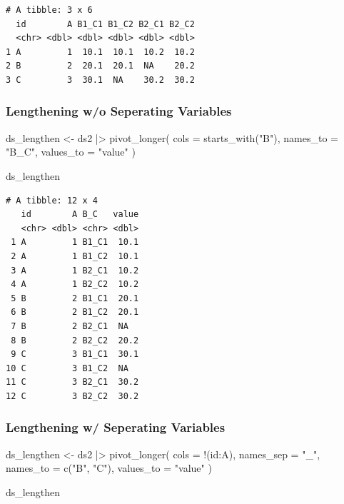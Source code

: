 \documentclass[
  letterpaper,
  DIV=11,
  numbers=noendperiod]{scrreprt}
\newenvironment{Shaded}{\begin{snugshade}}{\end{snugshade}}
\newcommand{\AttributeTok}[1]{\textcolor[rgb]{0.40,0.45,0.13}{#1}}
\newcommand{\FunctionTok}[1]{\textcolor[rgb]{0.28,0.35,0.67}{#1}}
\newcommand{\NormalTok}[1]{\textcolor[rgb]{0.00,0.23,0.31}{#1}}
\newcommand{\OtherTok}[1]{\textcolor[rgb]{0.00,0.23,0.31}{#1}}
\newcommand{\SpecialCharTok}[1]{\textcolor[rgb]{0.37,0.37,0.37}{#1}}
\newcommand{\StringTok}[1]{\textcolor[rgb]{0.13,0.47,0.30}{#1}}
\begin{document}
\begin{verbatim}
# A tibble: 3 x 6
  id        A B1_C1 B1_C2 B2_C1 B2_C2
  <chr> <dbl> <dbl> <dbl> <dbl> <dbl>
1 A         1  10.1  10.1  10.2  10.2
2 B         2  20.1  20.1  NA    20.2
3 C         3  30.1  NA    30.2  30.2
\end{verbatim}

\subsubsection{Lengthening w/o Seperating
Variables}\label{lengthening-wo-seperating-variables}

\begin{Shaded}
\begin{Highlighting}[]
\NormalTok{ds\_lengthen }\OtherTok{\textless{}{-}}\NormalTok{ ds2 }\SpecialCharTok{|\textgreater{}} 
  \FunctionTok{pivot\_longer}\NormalTok{(}
    \AttributeTok{cols =} \FunctionTok{starts\_with}\NormalTok{(}\StringTok{"B"}\NormalTok{),}
    \AttributeTok{names\_to =} \StringTok{"B\_C"}\NormalTok{,}
    \AttributeTok{values\_to =} \StringTok{"value"}
\NormalTok{  )}

\NormalTok{ds\_lengthen}
\end{Highlighting}
\end{Shaded}

\begin{verbatim}
# A tibble: 12 x 4
   id        A B_C   value
   <chr> <dbl> <chr> <dbl>
 1 A         1 B1_C1  10.1
 2 A         1 B1_C2  10.1
 3 A         1 B2_C1  10.2
 4 A         1 B2_C2  10.2
 5 B         2 B1_C1  20.1
 6 B         2 B1_C2  20.1
 7 B         2 B2_C1  NA  
 8 B         2 B2_C2  20.2
 9 C         3 B1_C1  30.1
10 C         3 B1_C2  NA  
11 C         3 B2_C1  30.2
12 C         3 B2_C2  30.2
\end{verbatim}

\subsubsection{Lengthening w/ Seperating
Variables}\label{lengthening-w-seperating-variables}

\begin{Shaded}
\begin{Highlighting}[]
\NormalTok{ds\_lengthen }\OtherTok{\textless{}{-}}\NormalTok{ ds2 }\SpecialCharTok{|\textgreater{}} 
  \FunctionTok{pivot\_longer}\NormalTok{(}
    \AttributeTok{cols =} \SpecialCharTok{!}\NormalTok{(id}\SpecialCharTok{:}\NormalTok{A),}
    \AttributeTok{names\_sep =} \StringTok{"\_"}\NormalTok{,}
    \AttributeTok{names\_to =} \FunctionTok{c}\NormalTok{(}\StringTok{"B"}\NormalTok{, }\StringTok{"C"}\NormalTok{),}
    \AttributeTok{values\_to =} \StringTok{"value"}
\NormalTok{  )}

\NormalTok{ds\_lengthen}
\end{Highlighting}
\end{Shaded}
\end{document}
